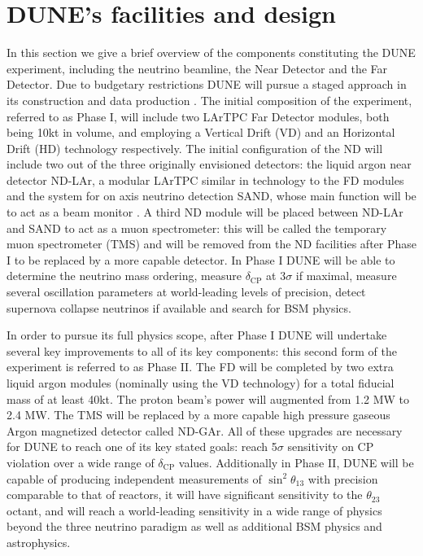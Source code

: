 \section{DUNE's facilities and design}
\label{Sec:DUNEfacilities}

In this section we give a brief overview of the components constituting the DUNE experiment, including the neutrino beamline, the Near Detector and the Far Detector. Due to budgetary restrictions DUNE will pursue a staged approach in its construction and data production \cite{DUNE:2022Snowmass}. The initial composition of the experiment, referred to as Phase I, will include two LArTPC Far Detector modules, both being 10kt in volume, and employing a Vertical Drift (VD) \cite{DUNE:2023TDRVD} and an Horizontal Drift (HD) technology \cite{DUNE:2020TDR4} respectively. The initial configuration of the ND will include two out of the three originally envisioned detectors: the liquid argon near detector ND-LAr, a modular LArTPC similar in technology to the FD modules and the system for on axis neutrino detection SAND, whose main function will be to act as a beam monitor \cite{Battisti:2022ND}. A third ND module will be placed between ND-LAr and SAND to act as a muon spectrometer: this will be called the temporary muon spectrometer (TMS) and will be removed from the ND facilities after Phase I to be replaced by a more capable detector. In Phase I DUNE will be able to determine the neutrino mass ordering, measure $\delta_\textrm{CP}$ at 3$\sigma$ if maximal, measure several oscillation parameters at world-leading levels of precision, detect supernova collapse neutrinos if available and search for BSM physics. 

In order to pursue its full physics scope, after Phase I DUNE will undertake several key improvements to all of its key components: this second form of the experiment is referred to as Phase II. The FD will be completed by two extra liquid argon modules (nominally using the VD technology) for a total fiducial mass of at least 40kt. The proton beam's power will augmented from 1.2 MW to 2.4 MW. The TMS will be replaced by a more capable high pressure gaseous Argon magnetized detector called ND-GAr. All of these upgrades are necessary for DUNE to reach one of its key stated goals: reach 5$\sigma$ sensitivity on CP violation over a wide range of $\delta_\textrm{CP}$ values. Additionally in Phase II, DUNE will be capable of producing independent measurements of $\sin^2{\theta_{13}}$ with precision comparable to that of reactors, it will have significant sensitivity to the $\theta_{23}$ octant, and will reach a world-leading sensitivity in a wide range of physics beyond the three neutrino paradigm as well as additional BSM physics and astrophysics. 


